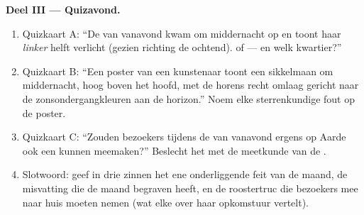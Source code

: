 \begin{problem}
\medskip\noindent\textbf{Deel III --- Quizavond.}
\begin{enumerate}[resume]
  \item Quizkaart A: ``De  van vanavond kwam om middernacht op en
        toont haar \emph{linker} helft verlicht (gezien richting de
        ochtend).  of  --- en welk kwartier?''
  \item Quizkaart B: ``Een poster van een kunstenaar toont een
        sikkelmaan om middernacht, hoog boven het hoofd, met de horens
        recht omlaag gericht naar de zonsondergangkleuren aan de
        horizon.'' Noem elke sterrenkundige fout op de poster.
  \item Quizkaart C: ``Zouden bezoekers tijdens de  van
        vanavond ergens op Aarde ook een  kunnen
        meemaken?'' Beslecht het met de meetkunde van de
        .
  \item Slotwoord: geef in drie zinnen het ene onderliggende feit van
        de maand, de misvatting die de maand begraven heeft, en de
        roostertruc die bezoekers mee naar huis moeten nemen (wat elke
         over haar opkomstuur vertelt).
\end{enumerate}
\end{problem}
